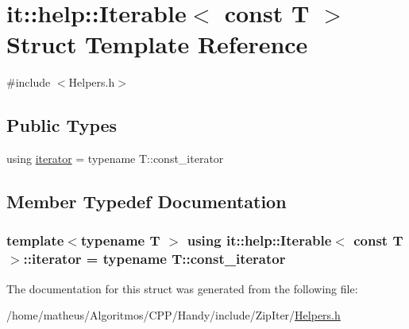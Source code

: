 \hypertarget{structit_1_1help_1_1Iterable_3_01const_01T_01_4}{}\section{it\+:\+:help\+:\+:Iterable$<$ const T $>$ Struct Template Reference}
\label{structit_1_1help_1_1Iterable_3_01const_01T_01_4}


{\ttfamily \#include $<$Helpers.\+h$>$}

\subsection*{Public Types}
\begin{DoxyCompactItemize}
\item 
using \hyperlink{structit_1_1help_1_1Iterable_3_01const_01T_01_4_aed9d4b32ea0d0cff09b6193be5f5ae58}{iterator} = typename T\+::const\+\_\+iterator
\end{DoxyCompactItemize}


\subsection{Member Typedef Documentation}
\subsubsection[{\texorpdfstring{iterator}{iterator}}]{\setlength{\rightskip}{0pt plus 5cm}template$<$typename T $>$ using {\bf it\+::help\+::\+Iterable}$<$ const T $>$\+::{\bf iterator} =  typename T\+::const\+\_\+iterator}\hypertarget{structit_1_1help_1_1Iterable_3_01const_01T_01_4_aed9d4b32ea0d0cff09b6193be5f5ae58}{}\label{structit_1_1help_1_1Iterable_3_01const_01T_01_4_aed9d4b32ea0d0cff09b6193be5f5ae58}


The documentation for this struct was generated from the following file\+:\begin{DoxyCompactItemize}
\item 
/home/matheus/\+Algoritmos/\+C\+P\+P/\+Handy/include/\+Zip\+Iter/\hyperlink{ZipIter_2Helpers_8h}{Helpers.\+h}\end{DoxyCompactItemize}
